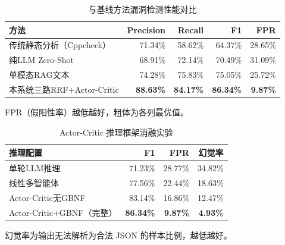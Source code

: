 \begin{table}[htbp]
  \centering
  \caption{与基线方法漏洞检测性能对比}
  \label{tab:baseline-comparison}
  \begin{tabular}{lrrrr}
    \toprule
    \textbf{方法} & \textbf{Precision} & \textbf{Recall} & \textbf{F1} & \textbf{FPR} \\
    \midrule
    传统静态分析（Cppcheck） & 71.34\% & 58.62\% & 64.37\% & 28.65\% \\
    纯LLM Zero-Shot & 68.91\% & 72.14\% & 70.49\% & 31.09\% \\
    单模态RAG文本 & 74.28\% & 75.83\% & 75.05\% & 25.72\% \\
    本系统三路RRF+Actor-Critic & \textbf{88.63\%} & \textbf{84.17\%} & \textbf{86.34\%} & \textbf{9.87\%} \\
    \bottomrule
  \end{tabular}
  \begin{tablenotes}\small\item FPR（假阳性率）越低越好，粗体为各列最优值。\end{tablenotes}
\end{table}

\begin{table}[htbp]
  \centering
  \caption{Actor-Critic 推理框架消融实验}
  \label{tab:actor-critic-ablation}
  \begin{tabular}{lrrr}
    \toprule
    \textbf{推理配置} & \textbf{F1} & \textbf{FPR} & \textbf{幻觉率} \\
    \midrule
    单轮LLM推理 & 71.23\% & 28.77\% & 34.82\% \\
    线性多智能体 & 77.56\% & 22.44\% & 18.63\% \\
    Actor-Critic无GBNF & 83.14\% & 16.86\% & 12.47\% \\
    Actor-Critic+GBNF（完整） & \textbf{86.34\%} & \textbf{9.87\%} & \textbf{4.93\%} \\
    \bottomrule
  \end{tabular}
  \begin{tablenotes}\small\item 幻觉率为输出无法解析为合法 JSON 的样本比例，越低越好。\end{tablenotes}
\end{table}

